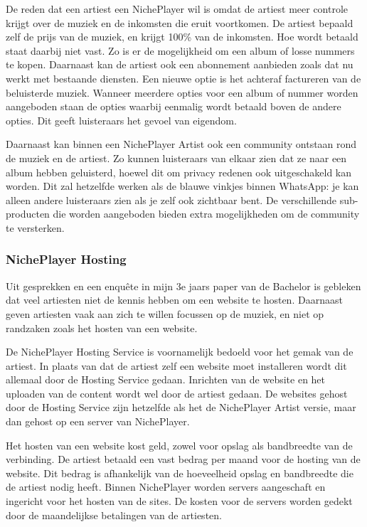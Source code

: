 De reden dat een artiest een NichePlayer wil is omdat de artiest meer controle krijgt over de muziek en de inkomsten die eruit voortkomen. De artiest bepaald zelf de prijs van de muziek, en krijgt 100\% van de inkomsten. Hoe wordt betaald staat daarbij niet vast. Zo is er de mogelijkheid om een album of losse nummers te kopen. Daarnaast kan de artiest ook een abonnement aanbieden zoals dat nu werkt met bestaande diensten. Een nieuwe optie is het achteraf factureren van de beluisterde muziek. Wanneer meerdere opties voor een album of nummer worden aangeboden staan de opties waarbij eenmalig wordt betaald boven de andere opties. Dit geeft luisteraars het gevoel van eigendom.

Daarnaast kan binnen een NichePlayer Artist ook een community ontstaan rond de muziek en de artiest. Zo kunnen luisteraars van elkaar zien dat ze naar een album hebben geluisterd, hoewel dit om privacy redenen ook uitgeschakeld kan worden. Dit zal hetzelfde werken als de blauwe vinkjes binnen WhatsApp: je kan alleen andere luisteraars zien als je zelf ook zichtbaar bent. De verschillende sub-producten die worden aangeboden bieden extra mogelijkheden om de community te versterken.

\subsubsection*{NichePlayer Hosting}
Uit gesprekken en een enquête in mijn 3e jaars paper van de Bachelor is gebleken dat veel artiesten niet de kennis hebben om een website te hosten. Daarnaast geven artiesten vaak aan zich te willen focussen op de muziek, en niet op randzaken zoals het hosten van een website.

De NichePlayer Hosting Service is voornamelijk bedoeld voor het gemak van de artiest. In plaats van dat de artiest zelf een website moet installeren wordt dit allemaal door de Hosting Service gedaan. Inrichten van de website en het uploaden van de content wordt wel door de artiest gedaan. De websites gehost door de Hosting Service zijn hetzelfde als het de NichePlayer Artist versie, maar dan gehost op een server van NichePlayer.

Het hosten van een website kost geld, zowel voor opslag als bandbreedte van de verbinding. De artiest betaald een vast bedrag per maand voor de hosting van de website. Dit bedrag is afhankelijk van de hoeveelheid opslag en bandbreedte die de artiest nodig heeft. Binnen NichePlayer worden servers aangeschaft en ingericht voor het hosten van de sites. De kosten voor de servers worden gedekt door de maandelijkse betalingen van de artiesten.

